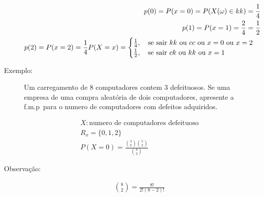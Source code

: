 \begin{description}
       \begin{align*}
         p(0)=P(x=0)=P(X(\omega)\in kk)=\frac{1}{4} \\
         p(1)=P(x=1)=\frac{2}{4}=\frac{1}{2}\\
         p(2)=P(x=2)=\frac{1}{4}
         P(X=x)= \begin{cases}
           \frac{1}{4}, \text{\quad se sair $kk$ ou $cc$ ou $x=0$ ou $x=2$}\\
           \frac{1}{2}, \text{\quad se sair $ck$ ou $kk$ ou $x=1$ }
         \end{cases}
       \end{align*}

     \item [Exemplo:] Um carregamento de 8 computadores contem 3 defeituosos. Se uma empresa de uma compra aleatória de dois computadores, apresente a f.m.p\ para o numero de computadores com defeitos adquiridos.

       \begin{align*}   X: \text{numero de computadores defeituoso}\\
         R_x = \{0,1,2\} \\
         P(X=0) = \frac{ \binom{3}{0} \binom{5}{2} }{ \binom{8}{2} }
       \end{align*}

     \item [Observação:]
       \begin{align*}
         \binom{8}{2} = \frac{8!}{2!\left( 8-2 \right)!}
       \end{align*} 


\end{description}

